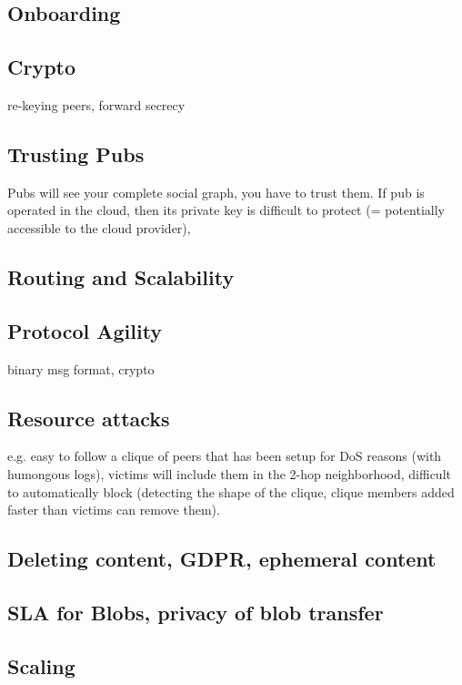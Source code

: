 \documentclass[sigconf]{acmart}
\begin{document}
\subsection{Onboarding}

\subsection{Crypto}

re-keying peers, forward secrecy

\subsection{Trusting Pubs}

Pubs will see your complete social graph, you have to trust them. If
pub is operated in the cloud, then its private key is difficult to
protect (= potentially accessible to the cloud provider),

\subsection{Routing and Scalability}

\subsection{Protocol Agility}

binary msg format, crypto

\subsection{Resource attacks}
e.g. easy to follow a clique of peers that has been setup for DoS
reasons (with humongous logs), victims will include them in the 2-hop
neighborhood, difficult to automatically block (detecting the shape of
the clique, clique members added faster than victims can remove them).

\subsection{Deleting content, GDPR, ephemeral content}

\subsection{SLA for Blobs, privacy of blob transfer}

\subsection{Scaling}
\end{document}
